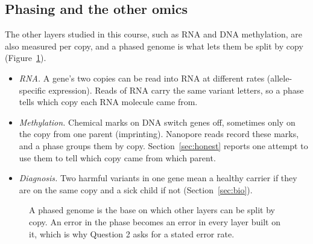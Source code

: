 \documentclass[11pt]{article}
\begin{document}
\subsection{Phasing and the other omics}

The other layers studied in this course, such as RNA and DNA methylation,
are also measured per copy, and a phased genome is what lets them be split
by copy (Figure~\ref{fig:omics}).
\begin{itemize}
\item \emph{RNA.} A gene's two copies can be read into RNA at different
  rates (allele-specific expression). Reads of RNA carry the same variant
  letters, so a phase tells which copy each RNA molecule came from.
\item \emph{Methylation.} Chemical marks on DNA switch genes off, sometimes
  only on the copy from one parent (imprinting). Nanopore reads record these
  marks, and a phase groups them by copy. Section~\ref{sec:honest} reports
  one attempt to use them to tell which copy came from which parent.
\item \emph{Diagnosis.} Two harmful variants in one gene mean a healthy
  carrier if they are on the same copy and a sick child if not
  (Section~\ref{sec:bio}).
\end{itemize}

\begin{figure}[h]
\centering
{}
\caption{A phased genome is the base on which other layers can be split by
copy. An error in the phase becomes an error in every layer built on it,
which is why Question 2 asks for a stated error rate.}
\label{fig:omics}
\end{figure}

\end{document}
